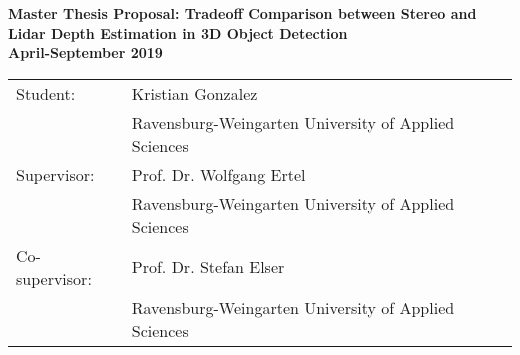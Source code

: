 \begin{center}

\large
\textbf{Master Thesis Proposal: Tradeoff Comparison between Stereo and Lidar Depth Estimation in 3D Object Detection}\\
\noindent \textbf{April-September 2019}\\
\normalsize 
\end{center}

\begin{tabular}{ll}
Student: & Kristian Gonzalez \\
 & Ravensburg-Weingarten University of Applied Sciences\\
Supervisor: & Prof. Dr. Wolfgang Ertel \\
 & Ravensburg-Weingarten University of Applied Sciences\\
Co-supervisor: & Prof. Dr. Stefan Elser\\
 & Ravensburg-Weingarten University of Applied Sciences\\
\end{tabular}

